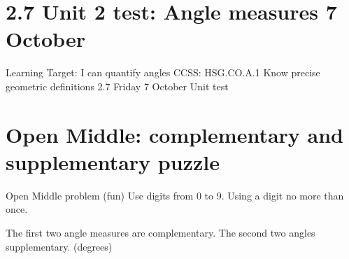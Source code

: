 \section{2.7 Unit 2 test: Angle measures \hfill 7 October}
\begin{frame}{Learning Target: I can quantify angles}
  {CCSS: HSG.CO.A.1 Know precise geometric definitions \hfill \alert{2.7 Friday 7 October}}
    \alert{Unit test}
  \end{frame}

\section{Open Middle: complementary and supplementary puzzle}
\begin{frame}{Open Middle problem (fun)}
  {Use digits from 0 to 9. Using a digit no more than once.}
    \begin{block}{The first two angle measures are complementary. The second two angles supplementary. (degrees)}
      \begin{center}
    \end{center}
    \end{block} \vspace{1cm} 
\end{frame}


